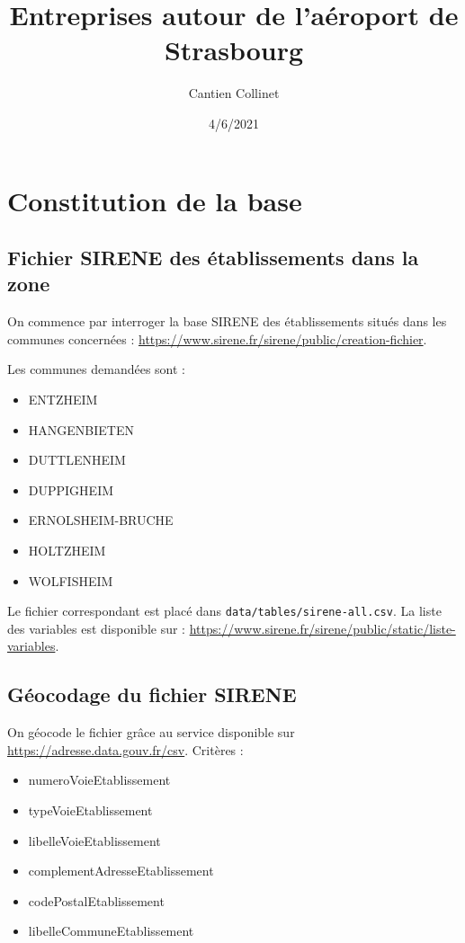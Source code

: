 \documentclass[
  french,
]{article}
\title{Entreprises autour de l'aéroport de Strasbourg}
\author{Cantien Collinet}
\date{4/6/2021}
\providecommand{\tightlist}{%
  \setlength{\itemsep}{0pt}\setlength{\parskip}{0pt}}
\begin{document}
\maketitle

{
\setcounter{tocdepth}{2}
\tableofcontents
}
\hypertarget{constitution-de-la-base}{%
\section{Constitution de la base}\label{constitution-de-la-base}}

\hypertarget{fichier-sirene-des-uxe9tablissements-dans-la-zone}{%
\subsection{Fichier SIRENE des établissements dans la
zone}\label{fichier-sirene-des-uxe9tablissements-dans-la-zone}}

On commence par interroger la base SIRENE des établissements situés dans
les communes concernées :
\url{https://www.sirene.fr/sirene/public/creation-fichier}.

Les communes demandées sont :

\begin{itemize}
\tightlist
\item
  ENTZHEIM
\item
  HANGENBIETEN
\item
  DUTTLENHEIM
\item
  DUPPIGHEIM
\item
  ERNOLSHEIM-BRUCHE
\item
  HOLTZHEIM
\item
  WOLFISHEIM
\end{itemize}

Le fichier correspondant est placé dans
\texttt{data/tables/sirene-all.csv}. La liste des variables est
disponible sur :
\url{https://www.sirene.fr/sirene/public/static/liste-variables}.

\hypertarget{guxe9ocodage-du-fichier-sirene}{%
\subsection{Géocodage du fichier
SIRENE}\label{guxe9ocodage-du-fichier-sirene}}

On géocode le fichier grâce au service disponible sur
\url{https://adresse.data.gouv.fr/csv}. Critères :

\begin{itemize}
\tightlist
\item
  numeroVoieEtablissement
\item
  typeVoieEtablissement
\item
  libelleVoieEtablissement
\item
  complementAdresseEtablissement
\item
  codePostalEtablissement
\item
  libelleCommuneEtablissement
\end{itemize}
\end{document}
